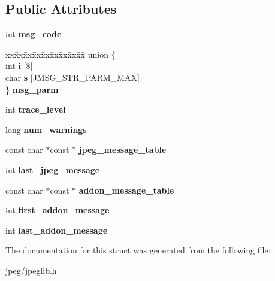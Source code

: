 \subsection*{Public Attributes}
\begin{DoxyCompactItemize}
\item 
int {\bfseries msg\+\_\+code}\hypertarget{structjpeg__error__mgr_a27fcf9391530acf9075836c5d11fff00}{}\label{structjpeg__error__mgr_a27fcf9391530acf9075836c5d11fff00}

\item 
\begin{tabbing}
xx\=xx\=xx\=xx\=xx\=xx\=xx\=xx\=xx\=\kill
union \{\\
\>int {\bfseries i} \mbox{[}8\mbox{]}\\
\>char {\bfseries s} \mbox{[}JMSG\_STR\_PARM\_MAX\mbox{]}\\
\} {\bfseries msg\_parm}\hypertarget{structjpeg__error__mgr_afb2ae8c2f526a365dd4c58246a642bb9}{}\label{structjpeg__error__mgr_afb2ae8c2f526a365dd4c58246a642bb9}
\\

\end{tabbing}\item 
int {\bfseries trace\+\_\+level}\hypertarget{structjpeg__error__mgr_a77328bf266cc3c3c4d9741fc27a4ef9b}{}\label{structjpeg__error__mgr_a77328bf266cc3c3c4d9741fc27a4ef9b}

\item 
long {\bfseries num\+\_\+warnings}\hypertarget{structjpeg__error__mgr_a6d74f34ca06fd61c9cc2b5818d317255}{}\label{structjpeg__error__mgr_a6d74f34ca06fd61c9cc2b5818d317255}

\item 
const char $\ast$const $\ast$ {\bfseries jpeg\+\_\+message\+\_\+table}\hypertarget{structjpeg__error__mgr_aeaa5c5dc26052bd7e367ceb35f670beb}{}\label{structjpeg__error__mgr_aeaa5c5dc26052bd7e367ceb35f670beb}

\item 
int {\bfseries last\+\_\+jpeg\+\_\+message}\hypertarget{structjpeg__error__mgr_a01d4d8f17f2d2ad49e5bd981c01296b9}{}\label{structjpeg__error__mgr_a01d4d8f17f2d2ad49e5bd981c01296b9}

\item 
const char $\ast$const $\ast$ {\bfseries addon\+\_\+message\+\_\+table}\hypertarget{structjpeg__error__mgr_af327179ad6b8d663a173e25615257e33}{}\label{structjpeg__error__mgr_af327179ad6b8d663a173e25615257e33}

\item 
int {\bfseries first\+\_\+addon\+\_\+message}\hypertarget{structjpeg__error__mgr_a35a1536b1171bb13510b5156ffa0af05}{}\label{structjpeg__error__mgr_a35a1536b1171bb13510b5156ffa0af05}

\item 
int {\bfseries last\+\_\+addon\+\_\+message}\hypertarget{structjpeg__error__mgr_a67531ea98e366e64d5b348446d50e806}{}\label{structjpeg__error__mgr_a67531ea98e366e64d5b348446d50e806}

\end{DoxyCompactItemize}


The documentation for this struct was generated from the following file\+:\begin{DoxyCompactItemize}
\item 
jpeg/jpeglib.\+h\end{DoxyCompactItemize}
